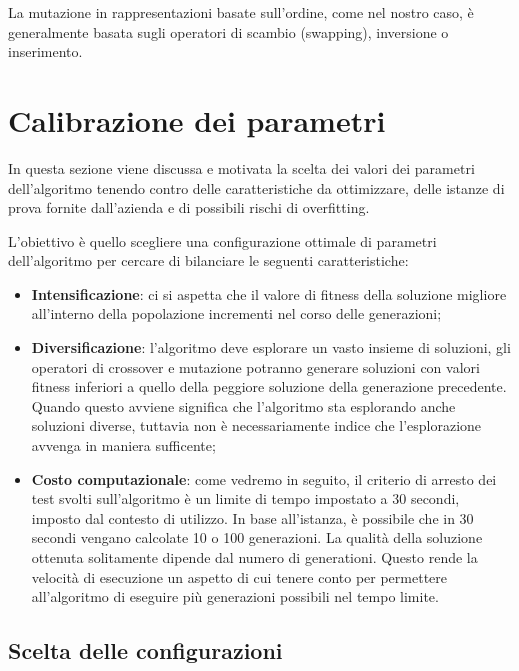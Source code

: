 La mutazione in rappresentazioni basate sull'ordine, come nel nostro caso, è generalmente basata sugli operatori di scambio (swapping), inversione o inserimento. 

\section{Calibrazione dei parametri}

In questa sezione viene discussa e motivata la scelta dei valori dei parametri dell'algoritmo tenendo contro delle caratteristiche da ottimizzare, delle istanze di prova fornite dall'azienda e di possibili rischi di overfitting.

L'obiettivo è quello scegliere una configurazione ottimale di parametri dell'algoritmo per cercare di bilanciare le seguenti caratteristiche:
\begin{itemize}
	\item\textbf{Intensificazione}: ci si aspetta che il valore di fitness della soluzione migliore all'interno della popolazione incrementi nel corso delle generazioni;
	\item\textbf{Diversificazione}: l'algoritmo deve esplorare un vasto insieme di soluzioni, gli operatori di crossover e mutazione potranno generare soluzioni con valori fitness inferiori a quello della peggiore soluzione della generazione precedente. Quando questo avviene significa che l'algoritmo sta esplorando anche soluzioni diverse, tuttavia non è necessariamente indice che l'esplorazione avvenga in maniera sufficente;
	\item\textbf{Costo computazionale}: come vedremo in seguito, il criterio di arresto dei test svolti sull'algoritmo è un limite di tempo impostato a 30 secondi, imposto dal contesto di utilizzo. In base all'istanza, è possibile che in 30 secondi vengano calcolate 10 o 100 generazioni. La qualità della soluzione ottenuta solitamente dipende dal numero di generationi. Questo rende la velocità di esecuzione un aspetto di cui tenere conto per permettere all'algoritmo di eseguire più generazioni possibili nel tempo limite.
\end{itemize}

\subsection{Scelta delle configurazioni}


